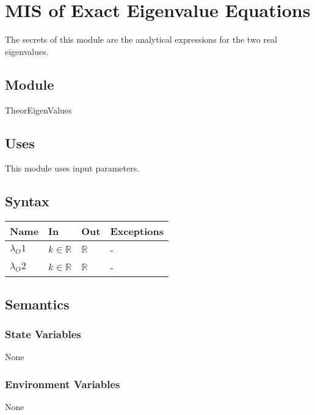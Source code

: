 \documentclass[12pt, titlepage]{article}
\begin{document}
\section{MIS of Exact Eigenvalue Equations} 

The secrets of this module are the analytical expressions for the two real 
eigenvalues. 

\subsection{Module}

TheorEigenValues

\subsection{Uses}

This module uses input parameters. 

\subsection{Syntax}

\begin{center}
	\begin{tabular}{p{3cm} p{3cm} p{3cm} >{\raggedright\arraybackslash}p{7cm}}
		\toprule
		\textbf{Name} & \textbf{In} & \textbf{Out} & \textbf{Exceptions} \\
		\hline
		$\lambda_O1$ & $k \in \mathbb{R}$ & $\mathbb{R}$ & - \\
		$\lambda_O2$ & $k \in \mathbb{R}$ & $\mathbb{R}$ & - \\ 
		\hline
	\end{tabular}
\end{center}

\subsection{Semantics}

\subsubsection{State Variables}

None

\subsubsection{Environment Variables}

None
\end{document}
